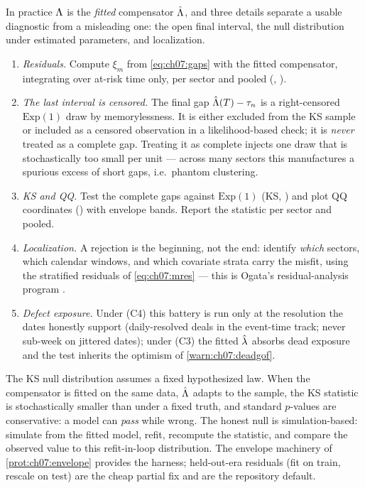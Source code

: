 In practice $\Lambda$ is the \emph{fitted} compensator $\hat{\Lambda}$, and three
details separate a usable diagnostic from a misleading one: the open final
interval, the null distribution under estimated parameters, and
localization.

\begin{protocol}\label{prot:ch07:rescaling}
\leavevmode
\begin{enumerate}[label=(\alph*)]
\item \emph{Residuals.} Compute $\xi_m$ from \cref{eq:ch07:gaps} with the
fitted compensator, integrating over at-risk time only, per sector and
pooled (, ).
\item \emph{The last interval is censored.} The final gap
$\hat{\Lambda}(T)-\tau_n$ is a right-censored $\mathrm{Exp}(1)$ draw by
memorylessness. It is either excluded from the KS sample or included as a
censored observation in a likelihood-based check; it is \emph{never}
treated as a complete gap. Treating it as complete injects one draw that
is stochastically too small per unit --- across many sectors this
manufactures a spurious excess of short gaps, i.e.\ phantom clustering.
\item \emph{KS and QQ.} Test the complete gaps against $\mathrm{Exp}(1)$
(KS, ) and plot QQ coordinates ()
with envelope bands. Report the statistic per sector and pooled.
\item \emph{Localization.} A rejection is the beginning, not the end:
identify \emph{which} sectors, which calendar windows, and which
covariate strata carry the misfit, using the stratified residuals of
\cref{eq:ch07:mres} --- this is Ogata's residual-analysis program
\citep{ogata1988}.
\item \emph{Defect exposure.} Under (C4) this battery is run only at the
resolution the dates honestly support (daily-resolved deals in the
event-time track; never sub-week on jittered dates); under (C3) the
fitted $\hat{\lambda}$ absorbs dead exposure and the test inherits the
optimism of \cref{warn:ch07:deadgof}.
\end{enumerate}
\end{protocol}

\begin{warning}\label{warn:ch07:estimated}
The KS null distribution assumes a fixed hypothesized law. When the
compensator is fitted on the same data, $\hat{\Lambda}$ adapts to the sample,
the KS statistic is stochastically smaller than under a fixed truth, and
standard $p$-values are conservative: a model can \emph{pass} while
wrong. The honest null is simulation-based: simulate from the fitted
model, refit, recompute the statistic, and compare the observed value to
this refit-in-loop distribution. The envelope machinery of
\cref{prot:ch07:envelope} provides the harness; held-out-era residuals
(fit on train, rescale on test) are the cheap partial fix and are the
repository default.
\end{warning}

